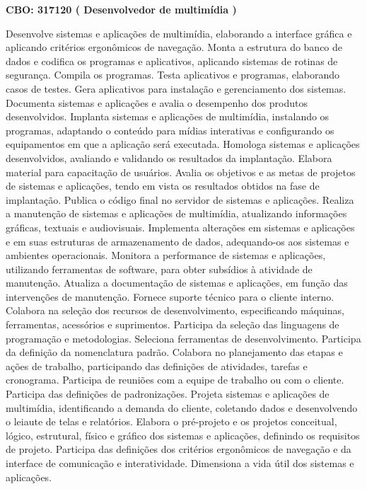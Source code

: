 \documentclass[
]{article}
\begin{document}
\textbf{CBO: 317120  ( Desenvolvedor de multimídia )}

Desenvolve sistemas e aplicações de multimídia, elaborando a interface
gráfica e aplicando critérios ergonômicos de navegação. Monta a
estrutura do banco de dados e codifica os programas e aplicativos,
aplicando sistemas de rotinas de segurança. Compila os programas. Testa
aplicativos e programas, elaborando casos de testes. Gera aplicativos
para instalação e gerenciamento dos sistemas. Documenta sistemas e
aplicações e avalia o desempenho dos produtos desenvolvidos. Implanta
sistemas e aplicações de multimídia, instalando os programas, adaptando
o conteúdo para mídias interativas e configurando os equipamentos em que
a aplicação será executada. Homologa sistemas e aplicações
desenvolvidos, avaliando e validando os resultados da implantação.
Elabora material para capacitação de usuários. Avalia os objetivos e as
metas de projetos de sistemas e aplicações, tendo em vista os resultados
obtidos na fase de implantação. Publica o código final no servidor de
sistemas e aplicações. Realiza a manutenção de sistemas e aplicações de
multimídia, atualizando informações gráficas, textuais e audiovisuais.
Implementa alterações em sistemas e aplicações e em suas estruturas de
armazenamento de dados, adequando-os aos sistemas e ambientes
operacionais. Monitora a performance de sistemas e aplicações,
utilizando ferramentas de software, para obter subsídios à atividade de
manutenção. Atualiza a documentação de sistemas e aplicações, em função
das intervenções de manutenção. Fornece suporte técnico para o cliente
interno. Colabora na seleção dos recursos de desenvolvimento,
especificando máquinas, ferramentas, acessórios e suprimentos. Participa
da seleção das linguagens de programação e metodologias. Seleciona
ferramentas de desenvolvimento. Participa da definição da nomenclatura
padrão. Colabora no planejamento das etapas e ações de trabalho,
participando das definições de atividades, tarefas e cronograma.
Participa de reuniões com a equipe de trabalho ou com o cliente.
Participa das definições de padronizações. Projeta sistemas e aplicações
de multimídia, identificando a demanda do cliente, coletando dados e
desenvolvendo o leiaute de telas e relatórios. Elabora o pré-projeto e
os projetos conceitual, lógico, estrutural, físico e gráfico dos
sistemas e aplicações, definindo os requisitos de projeto. Participa das
definições dos critérios ergonômicos de navegação e da interface de
comunicação e interatividade. Dimensiona a vida útil dos sistemas e
aplicações.
\end{document}
